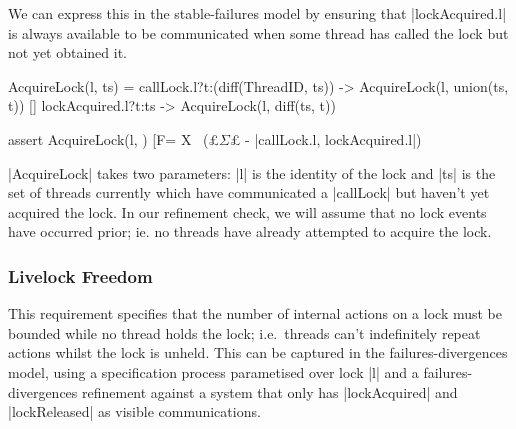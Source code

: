   
  

  We can express this in the stable-failures model by ensuring that |lockAcquired.l| is always available to be communicated when some thread has called the lock but not yet obtained it.

  \begin{cspm}
    AcquireLock(l, ts) = 
         callLock.l?t:(diff(ThreadID, ts)) -> AcquireLock(l, union(ts, {t}))
      [] lockAcquired.l?t:ts -> AcquireLock(l, diff(ts, {t}))

    assert AcquireLock(l, {}) [F= 
        X \ (£$\Sigma$£ - {|callLock.l, lockAcquired.l|})
  \end{cspm}
  |AcquireLock| takes two parameters: |l| is the identity of the lock and |ts| is the set of threads currently which have communicated a |callLock| but haven't yet acquired the lock. In our refinement check, we will assume that no lock events have occurred prior; ie. no threads have already attempted to acquire the lock. %

\subsubsection{Livelock Freedom}\label{livelock-freedom}
This requirement specifies that the number of internal actions on a lock must be bounded while no thread holds the lock; i.e.~threads can't indefinitely repeat actions whilst the lock is unheld. This can be captured in the failures-divergences model, using a specification process parametised over lock |l| and a failures-divergences refinement against a system that only has |lockAcquired| and |lockReleased| as visible communications.

